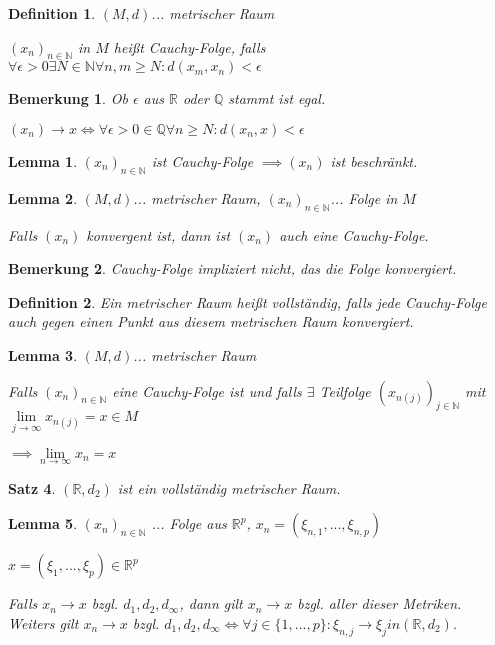 \documentclass[twocolumn]{article}
\newtheorem{theorem}{Satz}[section]
\newtheorem{lemma}[theorem]{Lemma}
\newtheorem{definition}{Definition}[section]
\newtheorem*{remark}{Bemerkung}
\newcommand*{\logeq}{\Leftrightarrow}
\begin{document}
\begin{definition}
	$(M,d)$... metrischer Raum
	
	$(x_n)_{n \in \mathbb{N}}$ in $M$ heißt Cauchy-Folge, falls $\forall \epsilon > 0 \exists N \in \mathbb{N} \forall n, m \geq N : d(x_m,x_n)< \epsilon$
\end{definition}

\begin{remark}
	Ob $\epsilon$ aus $\mathbb{R}$ oder $\mathbb{Q}$ stammt ist egal.
	
	$(x_n)\rightarrow x \logeq \forall \epsilon > 0 \in \mathbb{Q} \forall n \geq N : d(x_n,x) < \epsilon$
\end{remark}

\begin{lemma}
	$(x_n)_{n \in \mathbb{N}}$ ist Cauchy-Folge $\implies (x_n)$ ist beschränkt.
\end{lemma}

\begin{lemma}
	$(M,d)$... metrischer Raum, $(x_n)_{n \in \mathbb{N}}$... Folge in $M$
	
	Falls $(x_n)$ konvergent ist, dann ist $(x_n)$ auch eine Cauchy-Folge.
\end{lemma}

\begin{remark}
	Cauchy-Folge impliziert nicht, das die Folge konvergiert.
\end{remark}

\begin{definition}
	Ein metrischer Raum heißt vollständig, falls jede Cauchy-Folge auch gegen einen Punkt aus diesem metrischen Raum konvergiert.
\end{definition}

\begin{lemma}
	$(M,d)$... metrischer Raum
	
	Falls $(x_n)_{n \in \mathbb{N}}$ eine Cauchy-Folge ist und falls $\exists$ Teilfolge $(x_{n(j)})_{j \in \mathbb{N}}$ mit $\lim\limits_{j \rightarrow \infty}x_{n(j)}=x \in M$
	
	$\implies \lim\limits_{n \rightarrow \infty}x_n = x$
\end{lemma}

\begin{theorem}
	$(\mathbb{R},d_2)$ ist ein vollständig metrischer Raum.
\end{theorem}

\begin{lemma}
	$(x_n)_{n \in \mathbb{N}}$ ... Folge aus $\mathbb{R}^p$, $x_n=(\xi_{n,1},...,\xi_{n,p})$
	
	$x=(\xi_1,...,\xi_p) \in \mathbb{R}^p$
	
	Falls $x_n \rightarrow x$ bzgl. $d_1,d_2,d_{\infty}$, dann gilt $x_n \rightarrow x$ bzgl. aller dieser Metriken. Weiters gilt $x_n \rightarrow x$ bzgl. $d_1,d_2,d_{\infty} \logeq \forall j \in \{1,...,p\} : \xi_{n,j} \rightarrow \xi_j in (\mathbb{R}, d_2)$.
\end{lemma}
\end{document}
